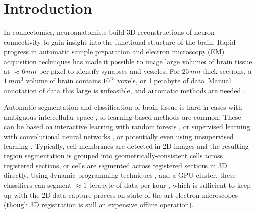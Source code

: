 \section{Introduction}


In connectomics, neuroanatomists build 3D reconstructions of neuron connectivity to gain insight into the functional structure of the brain. Rapid progress in automatic sample preparation and electron microscopy (EM) acquisition techniques has made it possible to image large volumes of brain tissue at $\approx6\, nm$ per pixel to identify synapses and vesicles. For $25\, nm$ thick sections, a $1\, mm^3$ volume of brain contains $10^{15}$ voxels, or 1 petabyte of data. Manual annotation of data this large is unfeasible, and automatic methods are needed \cite{jain2010,kaynig2015large,Liu2014,NunezIglesias2013Machine,GALA2014,amelio_segmentation}.

Automatic segmentation and classification of brain tissue is hard in cases with ambiguous intercellular space \cite{isbi_challenge}, so learning-based methods are common. These can be based on interactive learning with random forests \cite{Sommer2011Ilastik,kaynig2015large}, or supervised learning with convolutional neural networks \cite{Ciresan:2012f,RonnebergerFB15,lee2015recursive}, or potentially even using unsupervised learning \cite{BogovicHJ13}. Typically, cell membranes are detected in 2D images and the resulting region segmentation is grouped into geometrically-consistent cells across registered sections, or cells are segmented across registered sections in 3D directly. Using dynamic programming techniques \cite{Masci:2013a}, and a GPU cluster, these classifiers can segment  $\approx1$ terabyte of data per hour \cite{kasthuri2015saturated}, which is sufficient to keep up with the 2D data capture process on state-of-the-art electron microscopes (though 3D registration is still an expensive offline operation).


